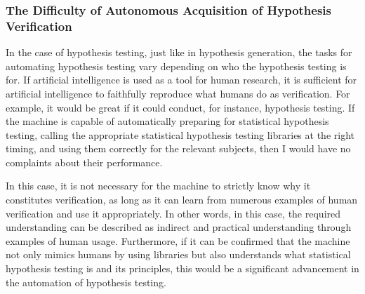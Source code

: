 

\subsubsection{The Difficulty of Autonomous Acquisition of Hypothesis Verification}
In the case of hypothesis testing, just like in hypothesis generation, the tasks for automating hypothesis testing vary depending on who the hypothesis testing is for. If artificial intelligence is used as a tool for human research, it is sufficient for artificial intelligence to faithfully reproduce what humans do as verification. For example, it would be great if it could conduct, for instance, hypothesis testing. If the machine is capable of automatically preparing for statistical hypothesis testing, calling the appropriate statistical hypothesis testing libraries at the right timing, and using them correctly for the relevant subjects, then I would have no complaints about their performance.

In this case, it is not necessary for the machine to strictly know why it constitutes verification, as long as it can learn from numerous examples of human verification and use it appropriately. In other words, in this case, the required understanding can be described as indirect and practical understanding through examples of human usage. Furthermore, if it can be confirmed that the machine not only mimics humans by using libraries but also understands what statistical hypothesis testing is and its principles, this would be a significant advancement in the automation of hypothesis testing. 

